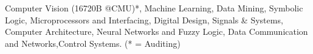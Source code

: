 %
%
%


\begin{courses}
	\course
	{Computer Vision (16720B @CMU)*, Machine Learning, Data Mining, Symbolic Logic, Microprocessors and Interfacing, Digital Design, Signals \& Systems, Computer Architecture, Neural Networks and Fuzzy Logic,  Data Communication and Networks,Control Systems. (* = Auditing)}

\end{courses}
\vspace{-4mm}
